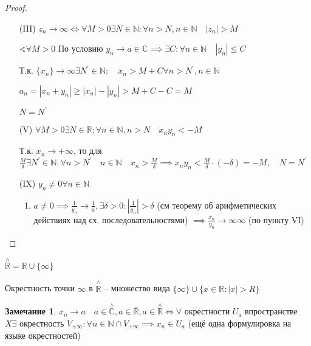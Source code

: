 \documentclass{book}
\newcommand\N{\ensuremath{\mathbb{N}}}
\newcommand\R{\ensuremath{\mathbb{R}}}
\renewcommand\C{\ensuremath{\mathbb{C}}}
\newcommand{\p}[1]{#1^{\prime}}
\newcommand{\ov}[1]{\overline{#1}}
\theoremstyle{definition}
\newtheorem*{note}{Замечание}
\begin{document}
\begin{proof}
    \begin{itemize}
        \item [(III)] $z_n\to \infty  \iff  \forall M>0 \exists N\in \N : \forall n>N, n\in \N \quad |z_n|>M$

            $\sphericalangle \forall M>0$ По условию $y_{n} \to a\in \C \implies  \exists C: \forall n\in \N \quad |y_{n} |\leqslant C$

            Т.к. $\{x_{n} \} \to \infty \exists \p N\in \N :\quad x_{n} >M+C \forall n>\p N, n\in \N $

            $a_n = |x_{n} +y_{n} | \geqslant  |x_{n} | - |y_{n} | >M+C-C = M$

            $N = \p N$
        \item [(V)] $\forall M>0 \exists N\in \R: \forall n\in \N , n>N\quad x_{n} y_{n} <-M$

            Т.к. $x_{n} \to +\infty $, то для  $\frac{M}{\delta} \exists \p N\in \N : \forall n>\p N\quad n\in \N \quad x_{n} >\frac{M}{\delta} \implies  x_{n}y_{n} <\frac{M}{\delta}\cdot (-\delta) = -M, \quad N = \p N$ 
        \item[(IX)] $y_{n} \neq 0 \forall n\in \N $
            \begin{enumerate}
                \item $a\neq 0 \implies \frac{1}{y_{n} }\to \frac{1}{a}, \exists \delta >0: \left| \frac{1}{y_{n} } \right| >\delta$ (см теорему об арифметических действиях над сх. последовательностями) $\implies \frac{x_{n} }{y_{n} } \to \infty \infty $ (по пункту VI)
            \end{enumerate}
    \end{itemize}
\end{proof}

$\overset{\land}{\R} = \R\cup \{\infty \}$

Окрестность точки $\infty $ в $\overset{\land}{\R}$ -- множество вида $\{\infty \}\cup \{x\in \R:|x|>R\}$

\begin{note}
    $x_{n} \to a\quad a\in \overset{\land}{\C}, a\in \ov{\R}, a\in \overset{\land}{\R} \iff  \forall $ окрестности $U_a$  впространстве  $X \exists $ окрестность $V_{+\infty }: \forall n\in \N \cap V_{+\infty } \implies  x_{n} \in U_a$ (ещё одна формулировка на языке окрестностей)
\end{note}
\end{document}
